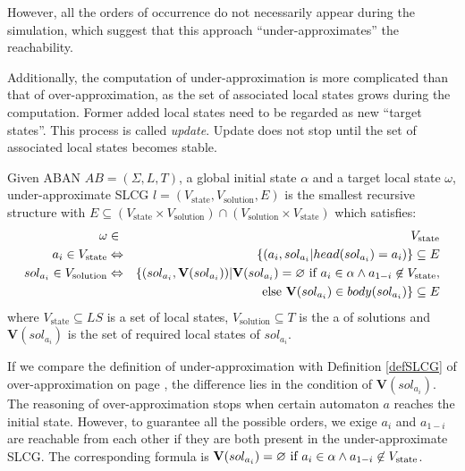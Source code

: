 However, all the orders of occurrence do not necessarily appear during the simulation, which suggest that this approach ``under-approximates'' the reachability.

Additionally, the computation of under-approximation is more complicated than that of over-approximation, as the set of associated local states grows during the computation.
Former added local states need to be regarded as new ``target states''.
This process is called \textit{update}. 
Update does not stop until the set of associated local states becomes stable.


\begin{definition}
Given ABAN $AB = (\Sigma,L,T)$, a global initial state $\alpha$ and a target local state $\omega$, under-approximate SLCG $l= (V_{\mathrm{state}},V_{\mathrm{solution}},E)$ is the smallest recursive structure with $E \subseteq (V_{\mathrm{state}}\times V_{\mathrm{solution}})\cap (V_{\mathrm{solution}}\times V_{\mathrm{state}})$ which satisfies:
\begin{eqnarray*}
    \omega&\in& V_{\mathrm{state}} \\
    a_i\in V_{\mathrm{state}} &\Leftrightarrow& \{ (a_i, sol_{a_i}| head(sol_{a_i})=a_i)\}\subseteq E \\
    sol_{a_i}\in V_{\mathrm{solution}}&\Leftrightarrow& \{ (sol_{a_i},\mathbf{V}(sol_{a_i}))| \mathbf{V}(sol_{a_i})=\varnothing \text{ \rm if } a_i\in \alpha\land a_{1-i}\not\in V_{\mathrm{state}},\\
    &&\text{ \rm else }\mathbf{V}(sol_{a_i})\in body(sol_{a_i}) \}\subseteq E
\end{eqnarray*}
where $V_{\mathrm{state}}\subseteq LS$ is a set of local states, $V_{\mathrm{solution}}\subseteq T$ is the a of solutions and $\mathbf{V}(sol_{a_i})$ is the set of required local states of $sol_{a_i}$. 
\end{definition}

If we compare the definition of under-approximation with Definition \ref{defSLCG} of over-approximation on page \pageref{defSLCG}, the difference lies in the condition of $\mathbf{V}(sol_{a_i})$. 
The reasoning of over-approximation stops when certain automaton $a$ reaches the initial state. 
However, to guarantee all the possible orders, we exige $a_i$ and $a_{1-i}$ are reachable from each other if they are both present in the under-approximate SLCG.
The corresponding formula is $\mathbf{V}(sol_{a_i})=\varnothing \text{ \rm if } a_i\in \alpha\land a_{1-i}\not\in V_{\mathrm{state}}$.


